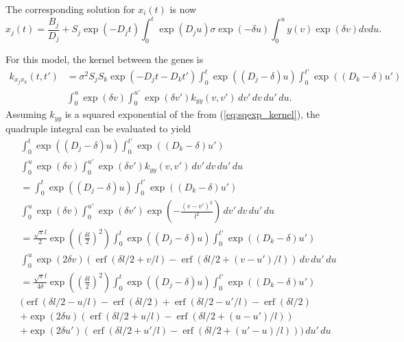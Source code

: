 \documentclass[a4paper]{article}
\newcommand{\erf}{\operatorname{erf}}
\begin{document}
The corresponding solution for $x_i(t)$ is now
\begin{equation}
  \label{eq:gpsim_f_x_sol}
  x_j(t) = \frac{B_j}{D_j} + S_j \exp(-D_j t) \int_0^t \exp(D_j
  u) \sigma \exp(-\delta u) \int_0^u y(v) \exp(\delta v) dv du.
\end{equation}

For this model, the kernel between the genes is
\begin{equation}
  \label{eq:gpsimy_genekernel0}
  \begin{split}
    k_{x_j x_k}(t, t') &= \sigma^2 S_j S_k \exp(-D_j t - D_k t')
    \int_0^t \exp((D_j - \delta) u)
    \int_0^{t'} \exp((D_k - \delta) u') \\
    & \int_0^u \exp(\delta v) \int_0^{u'} \exp(\delta v') k_{yy}(v, v') \, dv'\, dv\, du'\, du.
  \end{split}
\end{equation}
Assuming $k_{yy}$ is a squared exponential of the from
(\ref{eq:sqexp_kernel}), the quadruple integral can be evaluated to
yield
\begin{multline}
  \label{eq:gpsimy_kernel1}
  \int_0^t \exp((D_j - \delta) u)
  \int_0^{t'} \exp((D_k - \delta) u') \\
  \int_0^u \exp(\delta v) \int_0^{u'} \exp(\delta v') k_{yy}(v,
  v') \, dv'\, dv\, du'\, du \\
  = 
  \int_0^t \exp((D_j - \delta) u)
  \int_0^{t'} \exp((D_k - \delta) u') \\
  \int_0^u \exp(\delta v) \int_0^{u'} \exp(\delta v')
  \exp\left( -\frac{(v-v')^2}{l^2} \right) \, dv'\, dv\, du'\, du \\
  = 
  \frac{\sqrt{\pi}l}{2}\exp\left(\left(\frac{\delta l}{2}\right)^2\right)
  \int_0^t \exp((D_j - \delta) u)
  \int_0^{t'} \exp((D_k - \delta) u') \\
  \int_0^u \exp(2 \delta v) 
  (\erf(\delta l/2 + v/l) - \erf(\delta l/2 + (v-u')/l))
  \, dv\, du'\, du \\
  =
  \frac{\sqrt{\pi}l}{4\delta}\exp\left(\left(\frac{\delta l}{2}\right)^2\right)
  \int_0^t \exp((D_j - \delta) u)
  \int_0^{t'} \exp((D_k - \delta) u') \\
  \bigg(
  \erf(\delta l/2 - u/l) - \erf(\delta l/2)
  + \erf(\delta l/2 - u'/l) - \erf(\delta l/2) \\
  + \exp(2 \delta u) (\erf(\delta l/2 + u/l) - \erf(\delta l/2 +
  (u-u')/l)) \\
  + \exp(2 \delta u') (\erf(\delta l/2 + u'/l) - \erf(\delta l/2
  + (u'-u)/l))
  \bigg)
  \, du'\, du
\end{multline}
\end{document}
